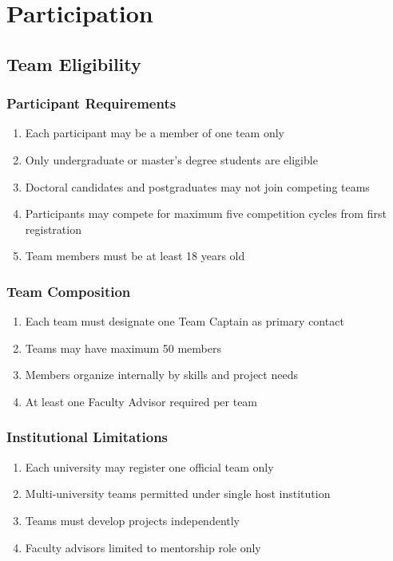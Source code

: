 
\renewcommand{\thesection}{P}
\section{Participation}

\subsection{Team Eligibility}

\subsubsection{Participant Requirements}
\begin{enumerate}[noitemsep]
    \item Each participant may be a member of one team only
    \item Only undergraduate or master's degree students are eligible
    \item Doctoral candidates and postgraduates may not join competing teams
    \item Participants may compete for maximum five competition cycles from first registration
    \item Team members must be at least 18 years old
\end{enumerate}

\subsubsection{Team Composition}
\begin{enumerate}[noitemsep]
    \item Each team must designate one Team Captain as primary contact
    \item Teams may have maximum 50 members
    \item Members organize internally by skills and project needs
    \item At least one Faculty Advisor required per team
\end{enumerate}

\subsubsection{Institutional Limitations}
\begin{enumerate}[noitemsep]
    \item Each university may register one official team only
    \item Multi-university teams permitted under single host institution
    \item Teams must develop projects independently
    \item Faculty advisors limited to mentorship role only
\end{enumerate}

